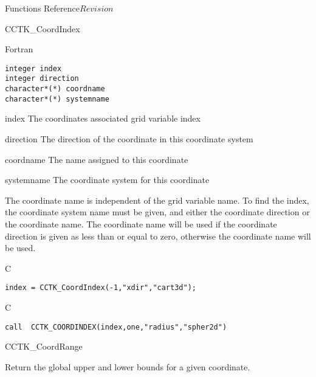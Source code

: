 \begin{cactuspart}{ Functions Reference}{}{$Revision$}
\begin{FunctionDescription}{CCTK\_CoordIndex}
\begin{SynopsisSection}
\begin{Synopsis}{Fortran}
\begin{verbatim}
integer index
integer direction
character*(*) coordname
character*(*) systemname\end{verbatim}
\end{Synopsis}
\end{SynopsisSection}
\begin{ParameterSection}
\begin{Parameter}{index}
The coordinates associated grid variable index
\end{Parameter}
\begin{Parameter}{direction}
The direction of the coordinate in this coordinate system
\end{Parameter}
\begin{Parameter}{coordname}
The name assigned to this coordinate
\end{Parameter}
\begin{Parameter}{systemname}
The coordinate system for this coordinate
\end{Parameter}
\end{ParameterSection}
\begin{Discussion}
The coordinate name is independent of the grid variable name.
To find the index, the coordinate system name must be given, and either
the coordinate direction or the coordinate name. The coordinate name
will be used if the coordinate direction is given as less than or equal to zero, otherwise the coordinate name will be used.
\end{Discussion}
\begin{ExampleSection}
\begin{Example}{C}
\begin{verbatim}
index = CCTK_CoordIndex(-1,"xdir","cart3d");
\end{verbatim}
\end{Example}
\begin{Example}{C}
\begin{verbatim}call  CCTK_COORDINDEX(index,one,"radius","spher2d")
\end{verbatim}
\end{Example}
\end{ExampleSection}
\end{FunctionDescription}


\begin{FunctionDescription}{CCTK\_CoordRange}%
{Return the global upper and lower bounds for a given coordinate.

}
\end{FunctionDescription}
\end{cactuspart}
